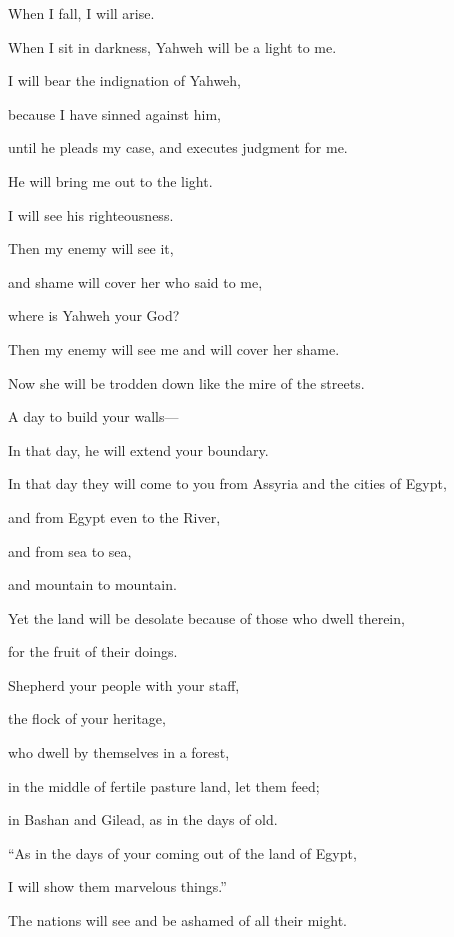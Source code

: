 {\par }{\QB When I fall, I will arise.
\par }{\QB When I sit in darkness, Yahweh will be a light to me.
\par }{\Q {}I will bear the indignation of Yahweh,
\par }{\QB because I have sinned against him,
\par }{\QB until he pleads my case, and executes judgment for me.
\par }{\QB He will bring me out to the light.
\par }{\QB I will see his righteousness.
\par }{\Q {}Then my enemy will see it,
\par }{\QB and shame will cover her who said to me,
\par }{\QB where is Yahweh your God?
\par }{\Q Then my enemy will see me and will cover her shame.
\par }{\QB Now she will be trodden down like the mire of the streets.
\par }{\Q {}A day to build your walls—
\par }{\QB In that day, he will extend your boundary.
\par }{\Q {}In that day they will come to you from Assyria and the cities of Egypt,
\par }{\QB and from Egypt even to the River,
\par }{\QB and from sea to sea,
\par }{\QB and mountain to mountain.
\par }{\Q {}Yet the land will be desolate because of those who dwell therein,
\par }{\QB for the fruit of their doings.
\par }{\Q {}Shepherd your people with your staff,
\par }{\QB the flock of your heritage,
\par }{\QB who dwell by themselves in a forest,
\par }{\QB in the middle of fertile pasture land, let them feed;
\par }{\QB in Bashan and Gilead, as in the days of old.
\par }{\Q {}“As in the days of your coming out of the land of Egypt,
\par }{\QB I will show them marvelous things.”
\par }{\Q {}The nations will see and be ashamed of all their might.
}
